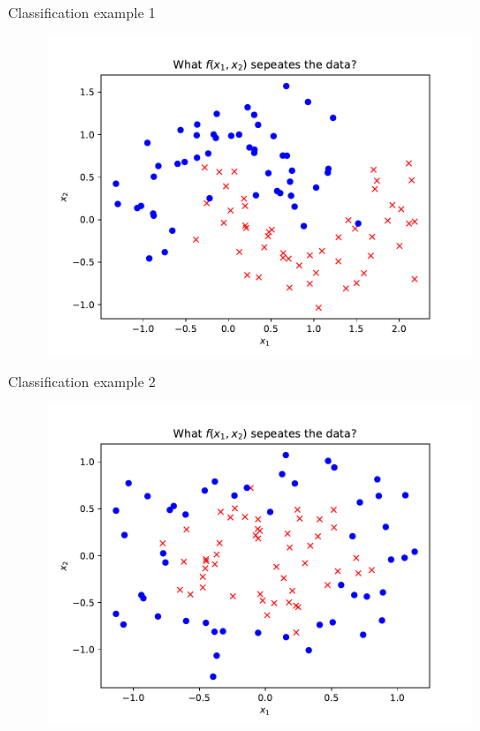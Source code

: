\documentclass[10pt]{beamer}
\begin{document}
\begin{frame}{Classification example 1}
\begin{figure}
\includegraphics[width=1.0\textwidth]{figs/1.pdf}
\end{figure}
\end{frame}

\begin{frame}{Classification example 2}
\begin{figure}
\includegraphics[width=1.0\textwidth]{figs/2.pdf}
\end{figure}
\end{frame}
\end{document}
